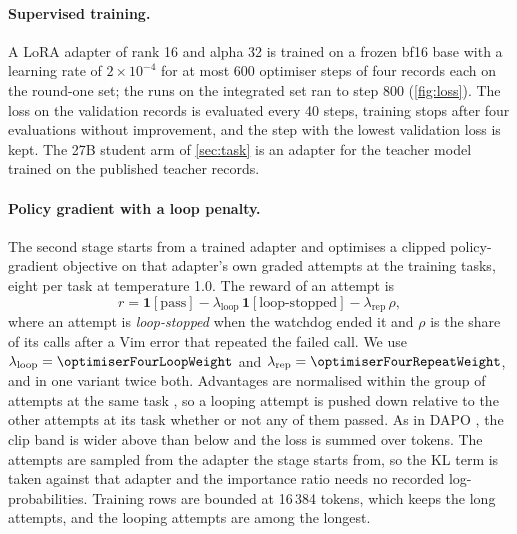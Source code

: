 \paragraph{Supervised training.} A LoRA adapter \citep{lora} of rank 16 and alpha 32 is trained on a frozen bf16 base
with a learning rate of $2\times10^{-4}$ for at most 600 optimiser steps of four records each on the round-one set; the runs on
the integrated set ran to step 800 (\cref{fig:loss}). The loss on the validation records is evaluated every 40 steps, training stops after four evaluations without
improvement, and the step with the lowest validation loss is kept. The 27B student arm of \cref{sec:task} is an adapter for the teacher model trained on the published teacher
records.

\paragraph{Policy gradient with a loop penalty.} The second stage starts from a trained adapter and optimises a clipped
policy-gradient objective \citep{ppo} on that adapter's own graded attempts at the training tasks, eight per task at
temperature 1.0. The reward of an attempt is
\begin{equation}
r = \mathbf{1}[\text{pass}] - \lambda_{\text{loop}}\,\mathbf{1}[\text{loop-stopped}] - \lambda_{\text{rep}}\,\rho,
\label{eq:reward}
\end{equation}
where an attempt is \emph{loop-stopped} when the watchdog ended it and $\rho$ is the share of its calls after a Vim
error that repeated the failed call. We use $\lambda_{\text{loop}}=\optimiserFourLoopWeight$ and
$\lambda_{\text{rep}}=\optimiserFourRepeatWeight$, and in one variant twice both. Advantages are normalised within the
group of attempts at the same task \citep{grpo}, so a looping attempt is pushed down relative to the other attempts at
its task whether or not any of them passed. As in DAPO \citep{dapo}, the clip band is wider above than below and the
loss is summed over tokens. The attempts are sampled from the adapter the stage starts from, so the KL term is taken
against that adapter and the importance ratio needs no recorded log-probabilities. Training rows are bounded at
16\,384 tokens, which keeps the long attempts, and the looping attempts are among the longest.
